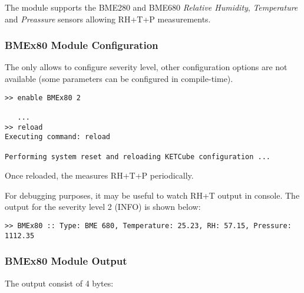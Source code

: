 The  module supports the BME280 and BME680 {\it Relative Humidity}, {\it Temperature} and {\it Preassure} sensors  allowing RH+T+P measurements.
  
\subsubsection{BMEx80 Module Configuration}
  
The  only allows to configure severity level, other configuration options are not available (some parameters can be configured in compile-time).
  
\begin{docCodeExample}
\begin{verbatim}
>> enable BMEx80 2

   ...
>> reload
Executing command: reload

Performing system reset and reloading KETCube configuration ...  
\end{verbatim}
\end{docCodeExample}
  
  Once reloaded, the  measures RH+T+P periodically. 
  
  For debugging purposes, it may be useful to watch RH+T output in console. The output for the severity level 2 (INFO) is shown below:

\begin{docCodeExample}
\begin{verbatim}
>> BMEx80 :: Type: BME 680, Temperature: 25.23, RH: 57.15, Pressure: 1112.35
\end{verbatim}
\end{docCodeExample}

\subsubsection{BMEx80 Module Output}
  The  output consist of 4 bytes:
  

